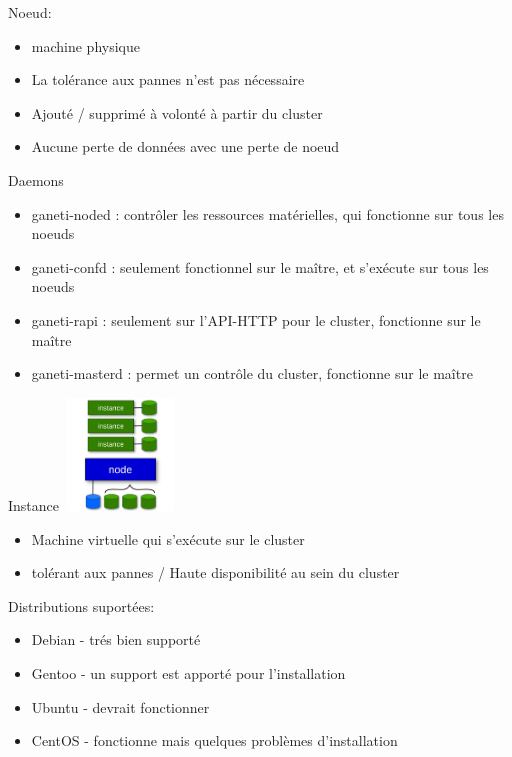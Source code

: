 \begin{frame}
Noeud:\\
\begin{itemize}
\item machine physique
\pause
\item La tolérance aux pannes n'est pas nécessaire
\pause
\item Ajouté / supprimé à volonté à partir du cluster
\pause
\item Aucune perte de données avec une perte de noeud
\end{itemize}
\end{frame}

\begin{frame}{Daemons}
\begin{itemize}
\item ganeti-noded : contrôler les ressources matérielles, qui fonctionne sur tous les noeuds
\pause
\item ganeti-confd : seulement fonctionnel sur le maître, et s'exécute sur tous les noeuds
\pause
\item ganeti-rapi : seulement sur l'API-HTTP  pour le cluster, fonctionne sur le maître
\pause
\item ganeti-masterd :  permet un contrôle du cluster, fonctionne sur le maître
\end{itemize}
\end{frame}

\begin{frame}{Instance}
\includegraphics[width=3cm,height=3cm]{images_presentation/instance.png}
\begin{itemize}
\item Machine virtuelle qui s'exécute sur le cluster
\pause
\item tolérant aux pannes / Haute disponibilité au sein du cluster
\end{itemize}
\end{frame}

\begin{frame}
Distributions suportées:\\
\begin{itemize}
\item Debian - trés bien supporté
\pause
\item Gentoo - un support est apporté pour l'installation
\pause
\item Ubuntu - devrait fonctionner
\pause
\item CentOS - fonctionne mais quelques problèmes d'installation
\end{itemize}
\end{frame}

